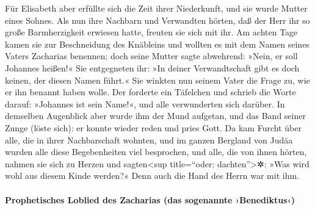  Für Elisabeth aber erfüllte sich die Zeit ihrer
Niederkunft, und sie wurde Mutter eines Sohnes.  Als nun
ihre Nachbarn und Verwandten hörten, daß der Herr ihr so große
Barmherzigkeit erwiesen hatte, freuten sie sich mit ihr. 
Am achten Tage kamen sie zur Beschneidung des Knäbleins und wollten es
mit dem Namen seines Vaters Zacharias benennen;  doch
seine Mutter sagte abwehrend: »Nein, er soll Johannes heißen!«
 Sie entgegneten ihr: »In deiner Verwandtschaft gibt es
doch keinen, der diesen Namen führt.«  Sie winkten nun
seinem Vater die Frage zu, wie er ihn benannt haben wolle.
 Der forderte ein Täfelchen und schrieb die Worte darauf:
»Johannes ist sein Name!«, und alle verwunderten sich darüber.
 In demselben Augenblick aber wurde ihm der Mund
aufgetan, und das Band seiner Zunge (löste sich): er konnte wieder reden
und pries Gott.  Da kam Furcht über alle, die in ihrer
Nachbarschaft wohnten, und im ganzen Bergland von Judäa wurden alle
diese Begebenheiten viel besprochen,  und alle, die von
ihnen hörten, nahmen sie sich zu Herzen und sagten\textless sup
title=``oder: dachten''\textgreater✲: »Was wird wohl aus diesem Kinde
werden?« Denn auch die Hand des Herrn war mit ihm.

\hypertarget{prophetisches-loblied-des-zacharias-das-sogenannte-benediktus}{%
\paragraph{Prophetisches Loblied des Zacharias (das sogenannte
›Benediktus‹)}\label{prophetisches-loblied-des-zacharias-das-sogenannte-benediktus}}


